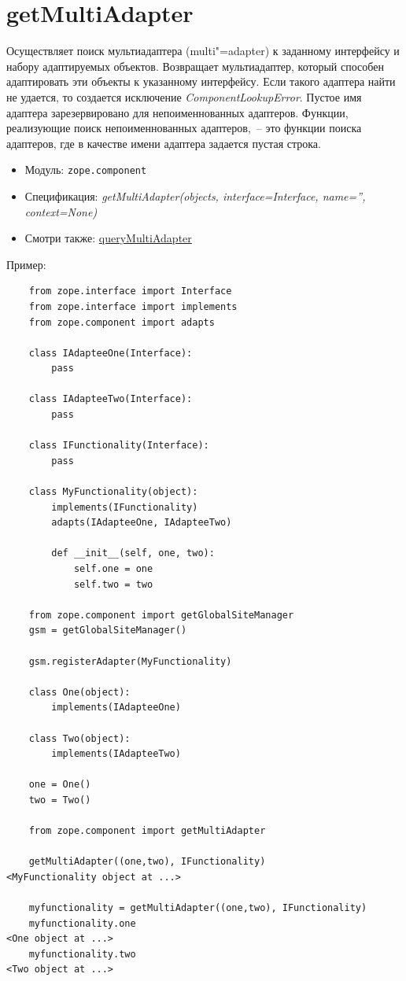 \documentclass[a4paper,openany,twoside,final]{book}
\providecommand*{\DUroletitlereference}[1]{\textsl{#1}}
\begin{document}
\section*{getMultiAdapter%
  \label{getmultiadapter}%
}

Осуществляет поиск мультиадаптера (multi"=adapter) к заданному интерфейсу и набору адаптируемых объектов.  Возвращает мультиадаптер, который способен адаптировать эти объекты к указанному интерфейсу.  Если такого адаптера найти не удается, то создается исключение \DUroletitlereference{ComponentLookupError}.  Пустое имя адаптера зарезервировано для непоименнованных адаптеров.  Функции, реализующие поиск непоименнованных адаптеров,~-- это функции поиска адаптеров, где в качестве имени адаптера задается пустая строка.

\begin{itemize}

\item Модуль: \texttt{zope.component}

\item Спецификация: \DUroletitlereference{getMultiAdapter(objects, interface=Interface, name='', context=None)}

\item Смотри также: \hyperref[querymultiadapter]{queryMultiAdapter}

\end{itemize}

Пример:

\begin{verbatim}
    from zope.interface import Interface
    from zope.interface import implements
    from zope.component import adapts

    class IAdapteeOne(Interface):
        pass

    class IAdapteeTwo(Interface):
        pass

    class IFunctionality(Interface):
        pass

    class MyFunctionality(object):
        implements(IFunctionality)
        adapts(IAdapteeOne, IAdapteeTwo)

        def __init__(self, one, two):
            self.one = one
            self.two = two

    from zope.component import getGlobalSiteManager
    gsm = getGlobalSiteManager()

    gsm.registerAdapter(MyFunctionality)

    class One(object):
        implements(IAdapteeOne)

    class Two(object):
        implements(IAdapteeTwo)

    one = One()
    two = Two()

    from zope.component import getMultiAdapter

    getMultiAdapter((one,two), IFunctionality)
<MyFunctionality object at ...>

    myfunctionality = getMultiAdapter((one,two), IFunctionality)
    myfunctionality.one
<One object at ...>
    myfunctionality.two
<Two object at ...>
\end{verbatim}
\end{document}
